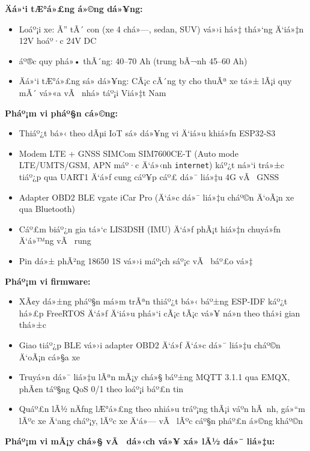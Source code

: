 \documentclass[a4paper]{extarticle}
\providecommand{\tightlist}{%
  \setlength{\itemsep}{0pt}\setlength{\parskip}{0pt}}
\begin{document}
\textbf{Äá»‘i tÆ°á»£ng á»©ng dá»¥ng:}

\begin{itemize}
\tightlist
\item
  Loáº¡i xe: Ã” tÃ´ con (xe 4 chá»—, sedan, SUV) vá»›i há»‡ thá»‘ng Ä‘iá»‡n 12V hoáº·c
  24V DC
\item
  áº®c quy phá»• thÃ´ng: 40--70 Ah (trung bÃ¬nh 45--60 Ah)
\item
  Äá»‘i tÆ°á»£ng sá»­ dá»¥ng: CÃ¡c cÃ´ng ty cho thuÃª xe tá»± lÃ¡i quy mÃ´ vá»«a vÃ  nhá»
  táº¡i Viá»‡t Nam
\end{itemize}

\textbf{Pháº¡m vi pháº§n cá»©ng:}

\begin{itemize}
\tightlist
\item
  Thiáº¿t bá»‹ theo dÃµi IoT sá»­ dá»¥ng vi Ä‘iá»u khiá»ƒn ESP32-S3
\item
  Modem LTE + GNSS SIMCom SIM7600CE-T (Auto mode LTE/UMTS/GSM, APN máº·c
  Ä‘á»‹nh \texttt{internet}) káº¿t ná»‘i trá»±c tiáº¿p qua UART1 Ä‘á»ƒ cung cáº¥p cáº£ dá»¯
  liá»‡u 4G vÃ  GNSS
\item
  Adapter OBD2 BLE vgate iCar Pro (Ä‘á»c dá»¯ liá»‡u cháº©n Ä‘oÃ¡n xe qua
  Bluetooth)
\item
  Cáº£m biáº¿n gia tá»‘c LIS3DSH (IMU) Ä‘á»ƒ phÃ¡t hiá»‡n chuyá»ƒn Ä‘á»™ng vÃ  rung
\item
  Pin dá»± phÃ²ng 18650 1S vá»›i máº¡ch sáº¡c vÃ  báº£o vá»‡
\end{itemize}

\textbf{Pháº¡m vi firmware:}

\begin{itemize}
\tightlist
\item
  XÃ¢y dá»±ng pháº§n má»m trÃªn thiáº¿t bá»‹ báº±ng ESP-IDF káº¿t há»£p FreeRTOS Ä‘á»ƒ Ä‘iá»u
  phá»‘i cÃ¡c tÃ¡c vá»¥ ná»n theo thá»i gian thá»±c
\item
  Giao tiáº¿p BLE vá»›i adapter OBD2 Ä‘á»ƒ Ä‘á»c dá»¯ liá»‡u cháº©n Ä‘oÃ¡n cá»§a xe
\item
  Truyá»n dá»¯ liá»‡u lÃªn mÃ¡y chá»§ báº±ng MQTT 3.1.1 qua EMQX, phÃ¢n táº§ng QoS 0/1
  theo loáº¡i báº£n tin
\item
  Quáº£n lÃ½ nÄƒng lÆ°á»£ng theo nhiá»u tráº¡ng thÃ¡i váº­n hÃ nh, gá»“m lÃºc xe Ä‘ang
  cháº¡y, lÃºc xe Ä‘á»— vÃ  lÃºc cáº§n pháº£n á»©ng kháº©n
\end{itemize}

\textbf{Pháº¡m vi mÃ¡y chá»§ vÃ  dá»‹ch vá»¥ xá»­ lÃ½ dá»¯ liá»‡u:}
\end{document}
